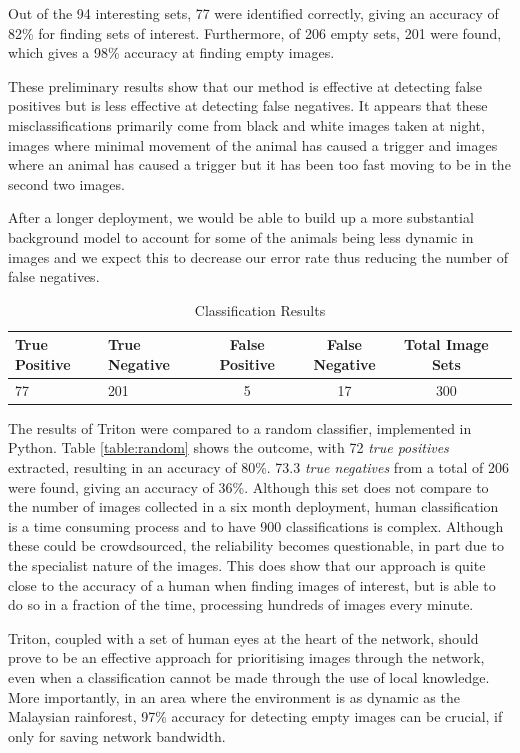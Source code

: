 		Out of the 94 interesting sets, 77 were identified correctly, giving an accuracy of 82\% for finding sets of interest. Furthermore, of 206 empty sets, 201 were found, which gives a 98\% accuracy at finding empty images.
	
		These preliminary results show that our method is effective at detecting false positives but is less effective at detecting false negatives. It appears that these misclassifications primarily come from black and white images taken at night, images where minimal movement of the animal has caused a trigger and images where an animal has caused a trigger but it has been too fast moving to be in the second two images.
		
		After a longer deployment, we would be able to build up a more substantial background model to account for some of the animals being less dynamic in images and we expect this to decrease our error rate thus reducing the number of false negatives. 
		
		\begin{table}
			\hfill{}
			\begin{tabular}{|l|l|c|c|c|c|}
				\hline
					True Positive & True Negative & False Positive  & False Negative & Total Image Sets \\
				\hline
					77 & 201 & 5 & 17 & 300 \\
				\hline
			\end{tabular}
			\hfill{}
			\caption{Classification Results}
			\label{table:processing}
		\end{table}
		
		The results of Triton were compared to a random classifier, implemented in Python. Table \ref{table:random} shows the outcome, with 72 \textit{true positives} extracted, resulting in an accuracy of 80\%. 73.3 \textit{true negatives} from a total of 206 were found, giving an accuracy of 36\%. Although this set does not compare to the number of images collected in a six month deployment, human classification is a time consuming process and to have 900 classifications is complex. Although these could be crowdsourced, the reliability becomes questionable, in part due to the specialist nature of the images. This does show that our approach is quite close to the accuracy of a human when finding images of interest, but is able to do so in a fraction of the time, processing hundreds of images every minute. 
		
		Triton, coupled with a set of human eyes at the heart of the network, should prove to be an effective approach for prioritising images through the network, even when a classification cannot be made through the use of local knowledge. More importantly, in an area where the environment is as dynamic as the Malaysian rainforest, 97\% accuracy for detecting empty images can be crucial, if only for saving network bandwidth.
		
